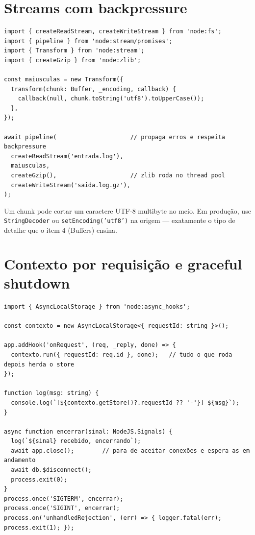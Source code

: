 \documentclass[12pt,a4paper,oneside]{book}
\newcommand{\code}[1]{\texttt{#1}}
\begin{document}
\section{Streams com backpressure}

\begin{verbatim}
import { createReadStream, createWriteStream } from 'node:fs';
import { pipeline } from 'node:stream/promises';
import { Transform } from 'node:stream';
import { createGzip } from 'node:zlib';

const maiusculas = new Transform({
  transform(chunk: Buffer, _encoding, callback) {
    callback(null, chunk.toString('utf8').toUpperCase());
  },
});

await pipeline(                     // propaga erros e respeita backpressure
  createReadStream('entrada.log'),
  maiusculas,
  createGzip(),                     // zlib roda no thread pool
  createWriteStream('saida.log.gz'),
);
\end{verbatim}

\begin{cuidado}
Um chunk pode cortar um caractere UTF-8 multibyte no meio. Em produção, use \code{StringDecoder} ou \code{setEncoding('utf8')} na origem --- exatamente o tipo de detalhe que o item 4 (Buffers) ensina.
\end{cuidado}

\section{Contexto por requisição e graceful shutdown}

\begin{verbatim}
import { AsyncLocalStorage } from 'node:async_hooks';

const contexto = new AsyncLocalStorage<{ requestId: string }>();

app.addHook('onRequest', (req, _reply, done) => {
  contexto.run({ requestId: req.id }, done);   // tudo o que roda depois herda o store
});

function log(msg: string) {
  console.log(`[${contexto.getStore()?.requestId ?? '-'}] ${msg}`);
}

async function encerrar(sinal: NodeJS.Signals) {
  log(`${sinal} recebido, encerrando`);
  await app.close();        // para de aceitar conexões e espera as em andamento
  await db.$disconnect();
  process.exit(0);
}
process.once('SIGTERM', encerrar);
process.once('SIGINT', encerrar);
process.on('unhandledRejection', (err) => { logger.fatal(err); process.exit(1); });
\end{verbatim}
\end{document}

